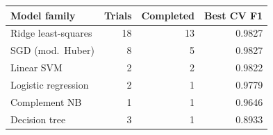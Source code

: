 \begin{tabular}{lrrr}
\toprule
Model family & Trials & Completed & Best CV F1 \\
\midrule
Ridge least-squares & 18 & 13 & 0.9827 \\
SGD (mod.\ Huber) & 8 & 5 & 0.9827 \\
Linear SVM & 2 & 2 & 0.9822 \\
Logistic regression & 2 & 1 & 0.9779 \\
Complement NB & 1 & 1 & 0.9646 \\
Decision tree & 3 & 1 & 0.8933 \\
\bottomrule
\end{tabular}